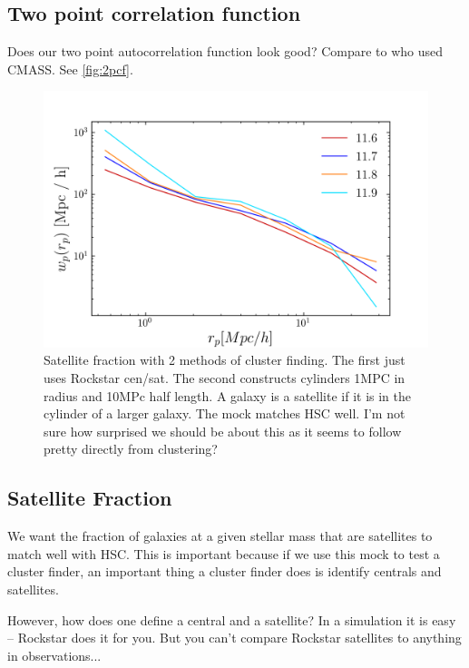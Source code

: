 \documentclass{article}
\begin{document}
\subsection{Two point correlation function}

Does our two point autocorrelation function look good? Compare to \cite{Tinker2017} who used CMASS. See \autoref{fig:2pcf}.

\begin{figure}[h]
    \includegraphics[width=\textwidth]{images/2pcf.png}
    \caption{Satellite fraction with 2 methods of cluster finding. The first just uses Rockstar cen/sat. The second constructs cylinders 1MPC in radius and 10MPc half length. A galaxy is a satellite if it is in the cylinder of a larger galaxy. The mock matches HSC well.
        I'm not sure how surprised we should be about this as it seems to follow pretty directly from clustering?
    \label{fig:2pcf}
}
\end{figure}

\subsection{Satellite Fraction}

We want the fraction of galaxies at a given stellar mass that are satellites to match well with HSC. This is important because if we use this mock to test a cluster finder, an important thing a cluster finder does is identify centrals and satellites.

However, how does one define a central and a satellite? In a simulation it is easy -- Rockstar does it for you. But you can't compare Rockstar satellites to anything in observations...
\end{document}
